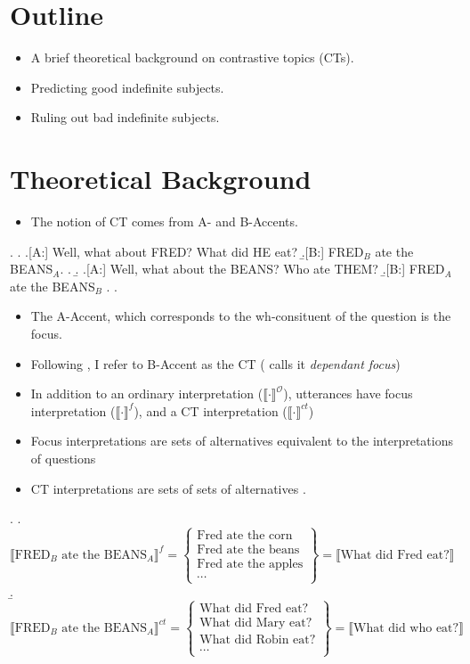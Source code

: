 \documentclass[letterpaper]{article}
\begin{document}
\section{Outline}
\begin{itemize}
  \item A brief theoretical background on contrastive topics (CTs).
  \item Predicting good indefinite subjects.
  \item Ruling out bad indefinite subjects.
\end{itemize}
\section{Theoretical Background}
\begin{itemize}
  \item The notion of CT comes from  A- and B-Accents.
\end{itemize}
\ex.
\a.
\a.[A:] Well, what about FRED? What did HE eat?
\b.[B:] FRED$_B$ ate the BEANS$_A$.
\z.
\b.
\a.[A:] Well, what about the BEANS? Who ate THEM?
\b.[B:] FRED$_A$ ate the BEANS$_B$
\z.
\z.

\begin{itemize}
  \item The A-Accent, which corresponds to the wh-consituent of the question is the focus.
  \item Following \textcite{buring2003d}, I refer to B-Accent as the CT (\textcite{roberts2012information} calls it \textit{dependant focus})
  \item In addition to an ordinary interpretation ($\llbracket\cdot\rrbracket^\mathcal{O}$), utterances have focus interpretation ($\llbracket\cdot\rrbracket^f$)\parencite{rooth1992theory}, and a CT interpretation ($\llbracket\cdot\rrbracket^{ct}$)\parencite{buring2003d}
  \item Focus interpretations are sets of alternatives \parencite{rooth1992theory} equivalent to the interpretations of questions \parencite{groenendijkstokhof1996questions}
  \item CT interpretations are sets of sets of alternatives \parencite{buring2003d}.
\end{itemize}
\ex. 
\a. $\llbracket\text{FRED}_B\text{ ate the BEANS}_A\rrbracket^{f} = 
\begin{Bmatrix}
  \text{Fred ate the corn}\\
  \text{Fred ate the beans}\\
  \text{Fred ate the apples}\\
  \cdots
\end{Bmatrix}
= \llbracket\text{What did Fred eat?}\rrbracket
$
\b.$\llbracket\text{FRED}_B\text{ ate the BEANS}_A\rrbracket^{ct} = 
\begin{Bmatrix}
  \text{What did Fred eat?}\\
  \text{What did Mary eat?}\\
  \text{What did Robin eat?}\\
  \cdots
\end{Bmatrix}
= \llbracket\text{What did who eat?}\rrbracket
$
\end{document}
